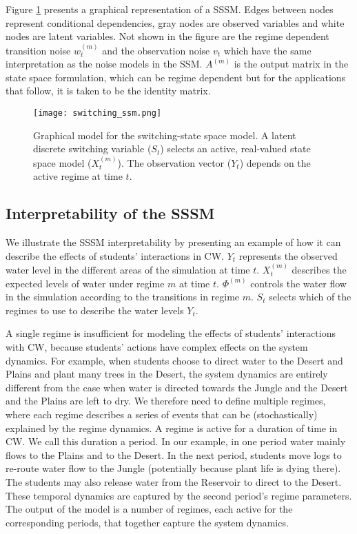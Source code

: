 Figure \ref{fig:switching_ssm} presents a graphical representation of a SSSM. Edges between nodes represent conditional dependencies, gray nodes are observed variables and white nodes are latent variables. Not shown in the figure are the regime dependent transition noise $w_t^{(m)}$ and the observation noise $v_t$ which have the same interpretation as the noise models in the SSM. $A^{(m)}$ is the output matrix in the state space formulation, which can be regime dependent but for the applications that follow, it is taken to be the identity matrix.

\begin{figure}
  \centering
  \texttt{[image: switching\_ssm.png]}
  \caption{Graphical model for the switching-state space model. A latent discrete switching variable ($S_t$) selects an active, real-valued state space model ($X^{(m)}_t$). The observation vector ($Y_t$)  depends on the active regime at time $t$.}
  \label{fig:switching_ssm}
\end{figure}

\subsection{Interpretability of the SSSM}\label{sec:interpretability_of_ssm}
We illustrate the SSSM interpretability by presenting an example of how it can describe the effects of students' interactions in CW. $Y_t$ represents the observed water level in the different areas of the simulation at time $t$. $X_t^{(m)}$ describes the expected levels of water under regime $m$ at time $t$. $\Phi^{(m)}$ controls the water flow in the simulation according to the transitions in regime $m$. $S_t$ selects which of the regimes to use to describe the water levels $Y_t$.

A single regime is insufficient for modeling the effects of students' interactions with CW, because students' actions have complex effects on the system dynamics. For example, when students choose to direct water to the Desert and Plains and plant many trees in the Desert, the system dynamics are entirely different from the case when water is directed towards the Jungle and the Desert and the Plains are left to dry. We therefore need to define multiple regimes, where each regime describes a series of events that can be (stochastically) explained by the regime dynamics. A regime is active for a duration of time in CW. We call this duration a period. In our example, in one period water mainly flows to the Plains and to the Desert. In the next period, students move logs to re-route water flow to the Jungle (potentially because plant life is dying there). The students may also release water from the Reservoir to direct to the Desert. These temporal dynamics are captured by the second period's regime parameters. The output of the model is a number of regimes, each active for the corresponding periods, that together capture the system dynamics.

